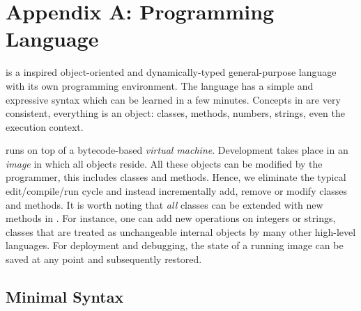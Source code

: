 
\appendix
\chapter{Appendix A: \PH Programming Language}
\label{appendixa}




\PH is a \ST inspired object-oriented and dynamically-typed general-purpose language with its own programming environment.
The language has a simple and expressive syntax which can be learned in a few minutes.
Concepts in \PH are very consistent, everything is an object: classes, methods, numbers, strings, even the execution context.

\PH runs on top of a bytecode-based \emph{virtual machine}.
Development takes place in an \emph{image} in which all objects reside.
All these objects can be modified by the programmer, this includes classes and methods.
Hence, we eliminate the typical edit/compile/run cycle and instead incrementally add, remove or modify classes and methods.
It is worth noting that \emph{all} classes can be extended with new methods in \PH.
For instance, one can add new operations on integers or strings, classes that are treated as unchangeable internal objects by many other high-level languages.
For deployment and debugging, the state of a running image can be saved at any point and subsequently restored.


\section{Minimal Syntax}

